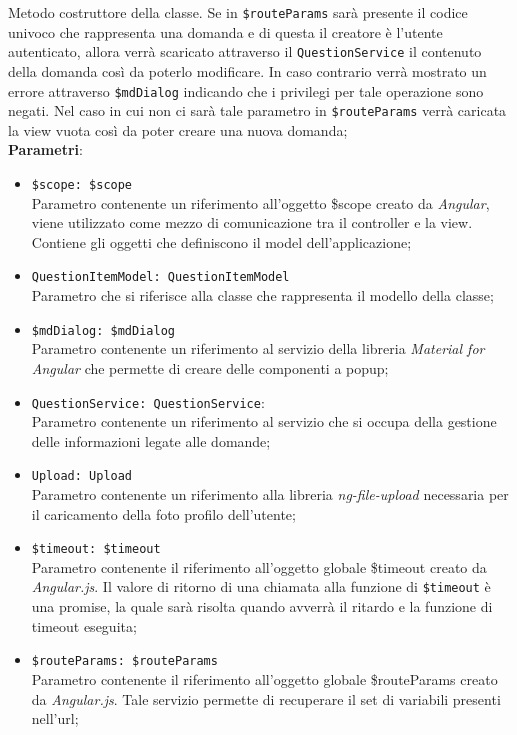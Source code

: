 \begin{itemize}
\begin{itemize}
		Metodo costruttore della classe. Se in \texttt{\$routeParams} sarà presente il codice univoco che rappresenta una domanda e di questa il creatore è l'utente autenticato, allora verrà scaricato attraverso il \texttt{QuestionService} il contenuto della domanda così da poterlo modificare. In caso contrario verrà mostrato un errore attraverso \texttt{\$mdDialog} indicando che i privilegi per tale operazione sono negati. Nel caso in cui non ci sarà tale parametro in \texttt{\$routeParams} verrà caricata la view vuota così da poter creare una nuova domanda; \\
		\textbf{Parametri}:
		\begin{itemize}
			\item \texttt{\$scope: \$scope} \\
			Parametro contenente un riferimento all’oggetto \$scope creato da \textit{Angular}, viene utilizzato come mezzo di comunicazione tra il controller e la view. Contiene gli oggetti che definiscono il model dell’applicazione;
			\item \texttt{QuestionItemModel: QuestionItemModel} \\ 
			Parametro che si riferisce alla classe che rappresenta il modello della classe;
			\item \texttt{\$mdDialog: \$mdDialog} \\
			Parametro contenente un riferimento al servizio della libreria \textit{Material for Angular} che permette di creare delle componenti a popup;
			\item \texttt{QuestionService: QuestionService}: \\
			Parametro contenente un riferimento al servizio che si occupa della gestione delle informazioni legate alle domande;
			\item \texttt{Upload: Upload} \\
			Parametro contenente un riferimento alla libreria \textit{ng-file-upload} necessaria per il caricamento della foto profilo dell'utente;
			\item \texttt{\$timeout: \$timeout} \\
			Parametro contenente il riferimento all'oggetto globale \$timeout creato da \textit{Angular.js}. 
			Il valore di ritorno di una chiamata alla funzione di \texttt{\$timeout} è una promise, la quale sarà risolta quando avverrà il ritardo e la funzione di timeout eseguita; 
			\item \texttt{\$routeParams: \$routeParams} \\
			Parametro contenente il riferimento all'oggetto globale \$routeParams creato da \textit{Angular.js}. Tale servizio permette di recuperare il set di variabili presenti nell'url; 

\end{itemize}
\end{itemize}
\end{itemize}
